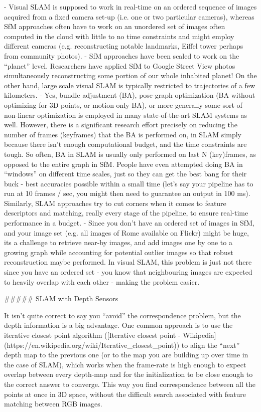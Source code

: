 - Visual SLAM is supposed to work in real-time on an ordered sequence of images acquired from a fixed camera set-up (i.e. one or two particular cameras), whereas SfM approaches often have to work on an unordered set of images often computed in the cloud with little to no time constraints and might employ different cameras (e.g. reconstructing notable landmarks, Eiffel tower perhaps from community photos).
- SfM approaches have been scaled to work on the “planet” level. Researchers have applied SfM to Google Street View photos simultaneously reconstructing some portion of our whole inhabited planet! On the other hand, large scale visual SLAM is typically restricted to trajectories of a few kilometers.
- Yes, bundle adjustment (BA), pose-graph optimization (BA without optimizing for 3D points, or motion-only BA), or more generally some sort of non-linear optimization is employed in many state-of-the-art SLAM systems as well. However, there is a significant research effort precisely on reducing the number of frames (keyframes) that the BA is performed on, in SLAM simply because there isn’t enough computational budget, and the time constraints are tough. So often, BA in SLAM is usually only performed on last N (key)frames, as opposed to the entire graph in SfM. People have even attempted doing BA in “windows” on different time scales, just so they can get the best bang for their buck - best accuracies possible within a small time (let’s say your pipeline has to run at 10 frames / sec, you might then need to guarantee an output in 100 ms). Similarly, SLAM approaches try to cut corners when it comes to feature descriptors and matching, really every stage of the pipeline, to ensure real-time performance in a budget.
- Since you don’t have an ordered set of images in SfM, and your image set (e.g. all images of Rome available on Flickr) might be huge, its a challenge to retrieve near-by images, and add images one by one to a growing graph while accounting for potential outlier images so that robust reconstruction maybe performed. In visual SLAM, this problem is just not there since you have an ordered set - you know that neighbouring images are expected to heavily overlap with each other - making the problem easier.

##### SLAM with Depth Sensors

It isn’t quite correct to say you “avoid” the correspondence problem, but the depth information is a big advantage. One common approach is to use the iterative closest point algorithm ([Iterative closest point - Wikipedia](https://en.wikipedia.org/wiki/Iterative_closest_point)) to align the “next” depth map to the previous one (or to the map you are building up over time in the case of SLAM), which works when the frame-rate is high enough to expect overlap between every depth-map and for the initialization to be close enough to the correct answer to converge. This way you find correspondence between all the points at once in 3D space, without the difficult search associated with feature matching between RGB images.



